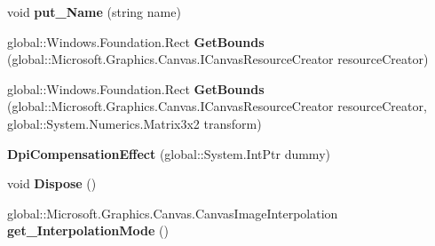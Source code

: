 \begin{DoxyCompactItemize}
\mbox{\label{class_microsoft_1_1_graphics_1_1_canvas_1_1_effects_1_1_dpi_compensation_effect_a983f24239964cb6b1729e5d84b18382b}} 
void {\bfseries put\+\_\+\+Name} (string name)
\item 
\mbox{\label{class_microsoft_1_1_graphics_1_1_canvas_1_1_effects_1_1_dpi_compensation_effect_aba9b66d9f3aa4b4ed69497eee8854bbd}} 
global\+::\+Windows.\+Foundation.\+Rect {\bfseries Get\+Bounds} (global\+::\+Microsoft.\+Graphics.\+Canvas.\+I\+Canvas\+Resource\+Creator resource\+Creator)
\item 
\mbox{\label{class_microsoft_1_1_graphics_1_1_canvas_1_1_effects_1_1_dpi_compensation_effect_affcc94a3d3762f96011af355812faf07}} 
global\+::\+Windows.\+Foundation.\+Rect {\bfseries Get\+Bounds} (global\+::\+Microsoft.\+Graphics.\+Canvas.\+I\+Canvas\+Resource\+Creator resource\+Creator, global\+::\+System.\+Numerics.\+Matrix3x2 transform)
\item 
\mbox{\label{class_microsoft_1_1_graphics_1_1_canvas_1_1_effects_1_1_dpi_compensation_effect_a54141aa5d933a8cdc483ca29381329b9}} 
{\bfseries Dpi\+Compensation\+Effect} (global\+::\+System.\+Int\+Ptr dummy)
\item 
\mbox{\label{class_microsoft_1_1_graphics_1_1_canvas_1_1_effects_1_1_dpi_compensation_effect_af986b9bbf6e6ad3ab1adde3673a2c57c}} 
void {\bfseries Dispose} ()
\item 
\mbox{\label{class_microsoft_1_1_graphics_1_1_canvas_1_1_effects_1_1_dpi_compensation_effect_ab1505e3760906582e945043639fcfb16}} 
global\+::\+Microsoft.\+Graphics.\+Canvas.\+Canvas\+Image\+Interpolation {\bfseries get\+\_\+\+Interpolation\+Mode} ()
\item 
\mbox{\label{class_microsoft_1_1_graphics_1_1_canvas_1_1_effects_1_1_dpi_compensation_effect_ab95d5e8e9e140918df664c046fe70e53}} 

\end{DoxyCompactItemize}
